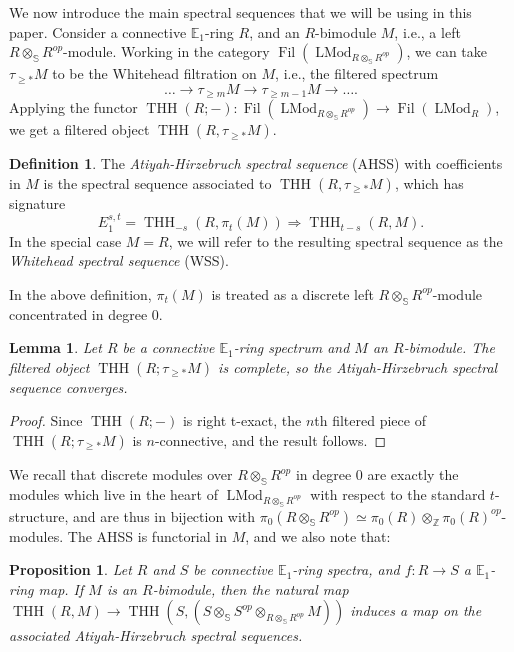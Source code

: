 \documentclass[11pt,leqno]{article}
\newcommand{\zz}{\mathbb{Z}}
\newcommand{\sss}{\mathbb{S}}
\newcommand{\bb}[1]{\mathbb{#1}}
\DeclareMathOperator{\THH}{THH}
\DeclareMathOperator{\LMod}{LMod}
\DeclareMathOperator{\Fil}{Fil}
\newtheorem*{short hand}{theorem name}
\theoremstyle{plain}  %
\newtheorem{proposition}{Proposition}[section]
\newtheorem{lemma}{Lemma}[section]
\theoremstyle{definition}
\newtheorem{definition}{Definition}[section]
\numberwithin{equation}{section}
\begin{document}
We now introduce the main spectral sequences that we will be using in this paper. Consider a connective $\bb{E}_{1}$-ring $R$, and an $R$-bimodule $M$, i.e., a left $R\otimes_{\sss} R^{op}$-module. Working in the category $\Fil(\LMod_{R\otimes_{\sss}R^{op}})$, we can take $\tau_{\geq *}M$ to be the Whitehead filtration on $M$, i.e., the filtered spectrum $$\ldots\to \tau_{\geq m}M\to\tau_{\geq m-1}M\to\ldots.$$  Applying the functor $\THH(R;-):\Fil(\LMod_{R\otimes_\sss R^{op}})\to \Fil(\LMod_R)$, we get a filtered object $\THH(R,\tau_{\geq *}M)$.
\begin{definition}\label{def2.3}
 The \textit{Atiyah-Hirzebruch spectral sequence} (AHSS) with coefficients in $M$ is the spectral sequence associated to $\THH(R,\tau_{\geq *}M)$, which has signature $$E_1^{s,t}=\THH_{-s}(R,\pi_{t}(M))\Rightarrow \THH_{t-s}(R,M).$$ In the special case $M=R$, we will refer to the resulting spectral sequence as the \textit{Whitehead spectral sequence} (WSS).
\end{definition} 
In the above definition, $\pi_t(M)$ is treated as a discrete left $R\otimes_{\sss}R^{op}$-module concentrated in degree 0.
\begin{lemma}\label{lemma2.4}
	Let $R$ be a connective $\bb{E}_1$-ring spectrum and $M$ an $R$-bimodule.  The filtered object $\THH(R;\tau_{\geq *}M)$ is complete, so the Atiyah-Hirzebruch spectral sequence converges.
\end{lemma}
\begin{proof}
Since $\THH(R;-)$ is right t-exact, the $n$th filtered piece of $\THH(R;\tau_{\geq *}M)$ is $n$-connective, and the result follows.
\end{proof}
We recall that discrete modules over $R\otimes_{\sss}R^{op}$ in degree 0 are exactly the modules which live in the heart of $\LMod_{R\otimes_{\sss}R^{op}}$ with respect to the standard $t$-structure, and are thus in bijection with $\pi_0(R\otimes_{\sss} R^{op})\simeq \pi_0(R)\otimes_{\zz}\pi_{0}(R)^{op}$-modules.  The AHSS is functorial in $M$, and we also note that:
\begin{proposition}\label{proposition2.5}
	Let $R$ and $S$ be connective $\bb{E}_1$-ring spectra, and $f:R\to S$ a $\bb{E}_1$-ring map.  If $M$ is an $R$-bimodule, then the natural map $\THH(R,M)\to \THH(S,(S\otimes_{\sss}S^{op}\otimes_{R\otimes_{\sss}R^{op}} M))$ induces a map on the associated Atiyah-Hirzebruch spectral sequences.
\end{proposition}
\end{document}
